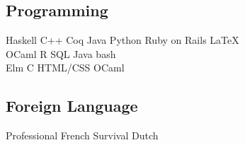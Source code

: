 \documentclass[]{deedy-resume-openfont}
\begin{document}
\begin{minipage}[t]{0.33\textwidth}
\subsection{Programming}
Haskell  \textbullet{} C++ \textbullet{} Coq \textbullet{} Java \textbullet{} Python \textbullet{} Ruby on Rails \textbullet{} \LaTeX \\ 
OCaml \textbullet{} R \textbullet{} SQL \textbullet{} Java \textbullet{} bash \\
Elm \textbullet{} C  \textbullet{} HTML/CSS \textbullet{} OCaml
\sectionsep

\subsection{Foreign Language}
Professional French \textbullet{} Survival Dutch
\sectionsep



%
%

\end{minipage} 
\hfill
\end{document}
